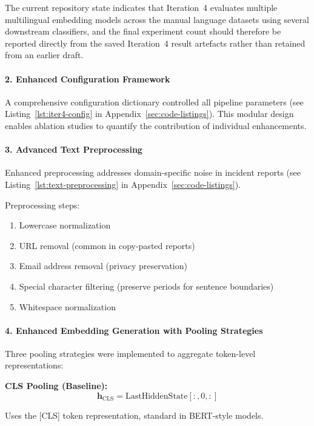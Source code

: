 \documentclass[11pt, titlepage, bibliography=totoc]{scrreprt}
\begin{document}
The current repository state indicates that Iteration~4 evaluates multiple multilingual embedding models across the manual language datasets using several downstream classifiers, and the final experiment count should therefore be reported directly from the saved Iteration~4 result artefacts rather than retained from an earlier draft.

\paragraph{2. Enhanced Configuration Framework}
A comprehensive configuration dictionary controlled all pipeline parameters (see Listing~\ref{lst:iter4-config} in Appendix~\ref{sec:code-listings}). This modular design enables ablation studies to quantify the contribution of individual enhancements.

\paragraph{3. Advanced Text Preprocessing}
Enhanced preprocessing addresses domain-specific noise in incident reports (see Listing~\ref{lst:text-preprocessing} in Appendix~\ref{sec:code-listings}).

Preprocessing steps:
\begin{enumerate}
    \item Lowercase normalization
    \item URL removal (common in copy-pasted reports)
    \item Email address removal (privacy preservation)
    \item Special character filtering (preserve periods for sentence boundaries)
    \item Whitespace normalization
\end{enumerate}

\paragraph{4. Enhanced Embedding Generation with Pooling Strategies}
Three pooling strategies were implemented to aggregate token-level representations:

\textbf{CLS Pooling (Baseline):}
\begin{equation}
\mathbf{h}_{\text{CLS}} = \text{LastHiddenState}[:, 0, :]
\end{equation}

Uses the [CLS] token representation, standard in BERT-style models.
\end{document}
